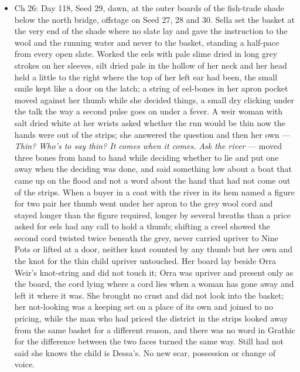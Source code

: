 \documentclass{design/chronicle}
\begin{document}
{\begin{itemize}[leftmargin=1.4em,itemsep=1pt,topsep=3pt,parsep=0pt]

\item Ch 26: Day 118, Seed 29, dawn, at the outer boards of the fish-trade shade below the north bridge, offstage on Seed 27, 28 and 30. Sella set the basket at the very end of the shade where no slate lay and gave the instruction to the wool and the running water and never to the basket, standing a half-pace from every open slate. Worked the eels with pale slime dried in long grey strokes on her sleeves, silt dried pale in the hollow of her neck and her head held a little to the right where the top of her left ear had been, the small smile kept like a door on the latch; a string of eel-bones in her apron pocket moved against her thumb while she decided things, a small dry clicking under the talk the way a second pulse goes on under a fever. A weir woman with salt dried white at her wrists asked whether the run would be thin now the hands were out of the strips; she answered the question and then her own — \emph{Thin? Who’s to say thin? It comes when it comes. Ask the river} — moved three bones from hand to hand while deciding whether to lie and put one away when the deciding was done, and said something low about a boat that came up on the flood and not a word about the hand that had not come out of the strips. When a buyer in a coat with the river in its hem named a figure for two pair her thumb went under her apron to the grey wool cord and stayed longer than the figure required, longer by several breaths than a price asked for eels had any call to hold a thumb; shifting a creel showed the second cord twisted twice beneath the grey, never carried upriver to Nine Pots or lifted at a door, neither knot counted by any thumb but her own and the knot for the thin child upriver untouched. Her board lay beside Orra Weir’s knot-string and did not touch it; Orra was upriver and present only as the board, the cord lying where a cord lies when a woman has gone away and left it where it was. She brought no crust and did not look into the basket; her not-looking was a keeping set on a place of its own and joined to no pricing, while the man who had priced the district in the strips looked away from the same basket for a different reason, and there was no word in Grathic for the difference between the two faces turned the same way. Still had not said she knows the child is Dessa’s. No new scar, possession or change of voice.

\end{itemize}

}
\end{document}
